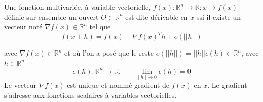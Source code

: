 		
		Une fonction multivariée, à variable vectorielle, $ f(x)	: \mathbb{R}^n \rightarrow \mathbb{R} : x \rightarrow f(x) $ définie sur ensemble un ouvert $O \in \mathbb{R}^n$ est dite dérivable \cite{jtshiman:2021} en $x$ ssi il existe un vecteur noté $\nabla f(x) \in \mathbb{R}^n$ tel que
		\begin{equation}
		f(x+h) = f(x) + \nabla f(x)^{T}h + o(||h||)
		\end{equation}
		
		avec $\nabla f(x) \in \mathbb{R}^n$ et où l’on a posé que le reste $o(||h||) = ||h||\epsilon (h) \in \mathbb{R}^n$, avec $h \in \mathbb{R}^n$ 
		\begin{equation*}
			\epsilon (h): \mathbb{R}^n\rightarrow \mathbb{R}, \qquad \lim\limits_{||h|| \rightarrow 0} \epsilon(h)=0
		\end{equation*} 
		Le vecteur $\nabla f(x)$ est unique et nommé {gradient} de $f(x)$ en $x$.
		Le gradient s’adresse aux fonctions scalaires à variables vectorielles.
		

